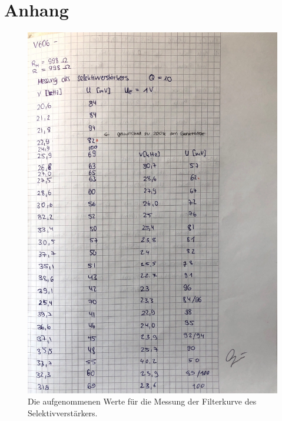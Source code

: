 \section{Anhang}
\label{sec:Anhang}
\begin{figure}
    \centering
    \includegraphics[width=\textwidth]{content/datenselektiv.pdf}
    \caption{Die aufgenommenen Werte für die Messung der Filterkurve des Selektivverstärkers.}
    \label{fig:datenselektiv}
\end{figure}
